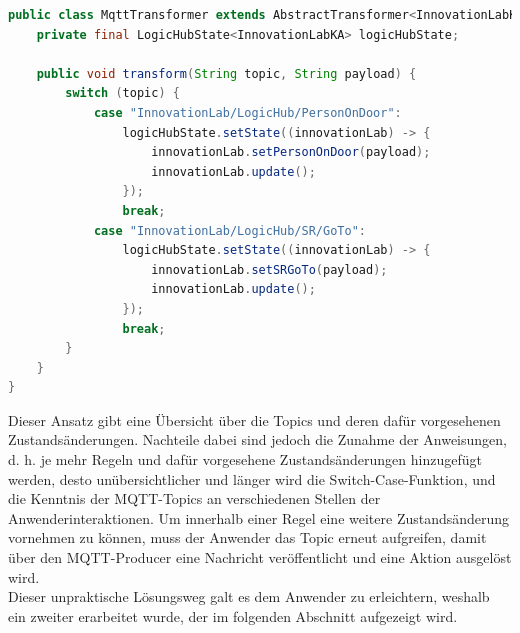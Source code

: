 \begin{lstlisting}[language=Java, frame=lines, xleftmargin=\parindent, style=algoBericht, label={code:switch-case}, captionpos=b, caption={Transformeation über eine Switch-Case-Anweisung}]
public class MqttTransformer extends AbstractTransformer<InnovationLabKA> {
    private final LogicHubState<InnovationLabKA> logicHubState;

    public void transform(String topic, String payload) {
        switch (topic) {
            case "InnovationLab/LogicHub/PersonOnDoor":
                logicHubState.setState((innovationLab) -> {
                    innovationLab.setPersonOnDoor(payload);
                    innovationLab.update();
                });
                break;
            case "InnovationLab/LogicHub/SR/GoTo":
                logicHubState.setState((innovationLab) -> {
                    innovationLab.setSRGoTo(payload);
                    innovationLab.update();
                });
                break;
        }    
    }
}
\end{lstlisting}
    Dieser Ansatz gibt eine Übersicht über die Topics und deren dafür vorgesehenen Zustandsänderungen. Nachteile dabei sind jedoch die Zunahme der Anweisungen, d. h. 
    je mehr Regeln und dafür vorgesehene Zustandsänderungen hinzugefügt werden, desto unübersichtlicher und länger wird die Switch-Case-Funktion, und die 
    Kenntnis der \acs{MQTT}-Topics an verschiedenen Stellen der Anwenderinteraktionen. Um innerhalb einer Regel eine weitere Zustandsänderung vornehmen zu können, muss der 
    Anwender das Topic erneut aufgreifen, damit über den \acs{MQTT}-Producer eine Nachricht veröffentlicht und eine Aktion ausgelöst wird. 
    \\
    Dieser unpraktische Lösungsweg galt es dem Anwender zu erleichtern, weshalb ein zweiter erarbeitet wurde, der im folgenden Abschnitt 
    aufgezeigt wird.

